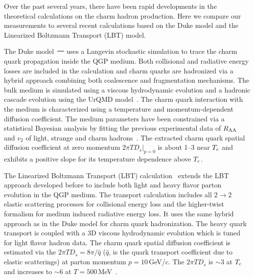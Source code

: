 \documentclass[%
 reprint,	
 amsmath,amssymb,
 aps,
 prc,
]{revtex4-1}
\providecommand{\DIFaddtex}[1]{{\protect\color{blue}\uwave{#1}}} %
\providecommand{\DIFdeltex}[1]{{\protect\color{red}\sout{#1}}}                      %
\providecommand{\DIFaddbegin}{} %
\providecommand{\DIFaddend}{} %
\providecommand{\DIFdelbegin}{} %
\providecommand{\DIFdelend}{} %
\providecommand{\DIFadd}[1]{\texorpdfstring{\DIFaddtex{#1}}{#1}} %
\providecommand{\DIFdel}[1]{\texorpdfstring{\DIFdeltex{#1}}{}} %
\begin{document}
\DIFaddend Over the past several years, there have been rapid developments in the theoretical calculations on the charm hadron production. Here we compare our measurements to several recent calculations based on the Duke model and the Linearized Boltzmann Transport (LBT) model.

The Duke model~\DIFdelbegin \DIFdel{\mbox{%
\cite{Duke,Xu:2017obm,DukePrivateCom} }%
}\DIFdelend \DIFaddbegin \DIFadd{\mbox{%
\cite{Duke,Xu:2017obm} }%
}\DIFaddend uses a Langevin stochastic simulation to trace the charm quark propagation inside the QGP medium. Both collisional and radiative energy losses are included in the calculation and charm quarks are hadronized via a hybrid approach combining both coalescence and fragmentation mechanisms. The bulk medium is simulated using a viscous hydrodynamic evolution and a hadronic cascade evolution using the UrQMD model~\cite{urQMD}. The charm quark interaction with the medium is characterized using a temperature and momentum-dependent diffusion coefficient. The medium parameters have been constrained via a statistical Bayesian analysis by fitting the previous experimental data of $R_{\rm AA}$ and $v_{2}$ of light, strange and charm hadrons~\cite{Xu:2017obm}. The extracted charm quark spatial diffusion coefficient at zero momentum $2\pi TD_s|_{p=0}$ is about 1--3 near $T_{\rm c}$ and exhibits a positive slope for its temperature dependence above $T_{\rm c}$.

The Linearized Boltzmann Transport (LBT) calculation~\cite{Cao:2016gvr} extends the LBT approach developed before to include both light and heavy flavor parton evolution in the QGP medium. The transport calculation includes all $2\rightarrow 2$ elastic scattering processes for collisional energy loss and the higher-twist formalism for medium induced radiative energy loss. It uses the same hybrid approach as in the Duke model for charm quark hadronization. The heavy quark transport is coupled with a 3D viscous hydrodynamic evolution which is tuned for light flavor hadron data. The charm quark spatial diffusion coefficient is estimated via the $2\pi TD_s =8\pi/\hat{q}$ ($\hat{q}$, is the quark transport coefficient due to elastic scatterings) at parton momentum $p = 10$\,GeV/$c$. The $2\pi TD_s$ is $\sim$3 at $T_{\rm c}$ and increases to $\sim$6 at $T = 500$\,MeV~\cite{LBT:private}.
\end{document}
